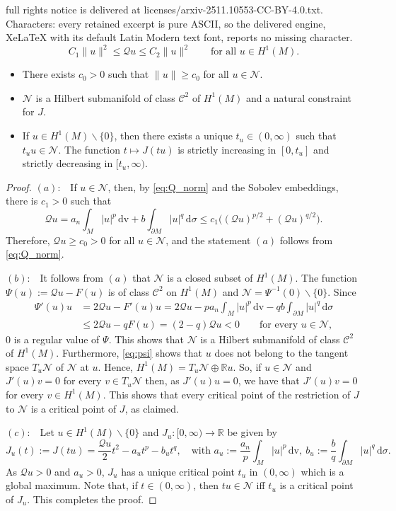 \documentclass[10pt,a4paper]{amsart}
\def\cC{\mathcal{C}}
\def\cN{\mathcal{N}}
\def\dv{\,\mathrm{dv}}
\def\d{\,\mathrm{d}}
\def\idm{\int_{\partial M}}
\def\im{\int_{M}}
\def\r{\mathbb{R}}
\begin{document}
full rights notice is delivered at licenses/arxiv-2511.10553-CC-BY-4.0.txt. Characters: every retained excerpt is pure ASCII, so the delivered engine, XeLaTeX with its default Latin Modern text font, reports no missing character.
\begin{equation} \label{eq:Q_norm}
C_1\|u\|^2 \leq \mathscr{Q}u \leq C_2\|u\|^2\qquad\text{for all \ }u\in H^1(M).
\end{equation}

\begin{lemma}\label{lem:nehari}
\begin{itemize}
\item[$(a)$]There exists $c_0>0$ such that $\|u\|\geq c_0$ for all $u\in\cN$.
\item[$(b)$]$\cN$ is a Hilbert submanifold of class $\cC^2$ of $H^1(M)$ and a natural constraint for $J$.
\item[$(c)$]If $u\in H^1(M)\smallsetminus\{0\}$, then there exists a unique $t_u\in(0,\infty)$ such that $t_uu\in\cN$. The function $t\mapsto J(tu)$ is strictly increasing in $[0,t_u]$ and strictly decreasing in $[t_u,\infty)$.
\end{itemize}
\end{lemma}

\begin{proof}
$(a):$ \ If $u\in\cN$, then, by \eqref{eq:Q_norm} and the Sobolev embeddings, there is $c_1>0$ such that
$$\mathscr{Q}u=a_n\im |u|^p \dv + b\idm|u|^q\d\sigma\leq c_1\Big((\mathscr{Q}u)^{p/2}+(\mathscr{Q}u)^{q/2}\Big).$$
Therefore, $\mathscr{Q}u\geq c_0>0$ for all $u\in\cN$, and the statement $(a)$ follows from \eqref{eq:Q_norm}.

$(b):$ \ It follows from $(a)$ that $\cN$ is a closed subset of $H^1(M)$. The function $\Psi(u):=\mathscr{Q} u-F(u)$ is of class $\cC^2$ on $H^1(M)$ and $\cN=\Psi^{-1}(0)\smallsetminus\{0\}$. Since
\begin{align}\label{eq:psi}
\Psi'(u)u&=2\mathscr{Q}u-F'(u)u=2\mathscr{Q}u-pa_n\im |u|^p\dv-qb\idm |u|^q\d \sigma \nonumber\\
&\leq 2\mathscr{Q}u-qF(u) =(2-q)\mathscr{Q}u<0\qquad\text{for every \ }u\in\cN,
\end{align}
$0$ is a regular value of $\Psi$. This shows that $\cN$ is a Hilbert submanifold of class $\cC^2$ of $H^1(M)$. Furthermore, \eqref{eq:psi} shows that $u$ does not belong to the tangent space $T_u\cN$ of $\cN$ at $u$. Hence, $H^1(M)=T_u\cN\oplus\r u$. So, if $u\in\cN$ and $J'(u)v=0$ for every $v\in T_u\cN$ then, as $J'(u)u=0$, we have that $J'(u)v=0$ for every $v\in H^1(M)$. This shows that every critical point of the restriction of $J$ to $\cN$ is a critical point of $J$, as claimed.

$(c):$ \ Let $u\in H^1(M)\smallsetminus\{0\}$ and $J_u:[0,\infty)\to\r$ be given by
$$J_u(t):=J(tu)=\frac{\mathscr{Q}u}{2} t^2- a_ut^p-b_ut^q,\quad\text{with \ }a_u:=\frac{a_n}{p}\im|u|^p\dv, \ b_u:=\frac{b}{q}\idm|u|^q\d\sigma.$$
As $\mathscr{Q}u>0$ and $a_u>0$, $J_u$ has a unique critical point $t_u$ in $(0,\infty)$ which is a global maximum. Note that, if $t\in(0,\infty)$, then $tu\in\cN$ iff $t_u$ is a critical point of $J_u$. This completes the proof.
\end{proof}
\end{document}
